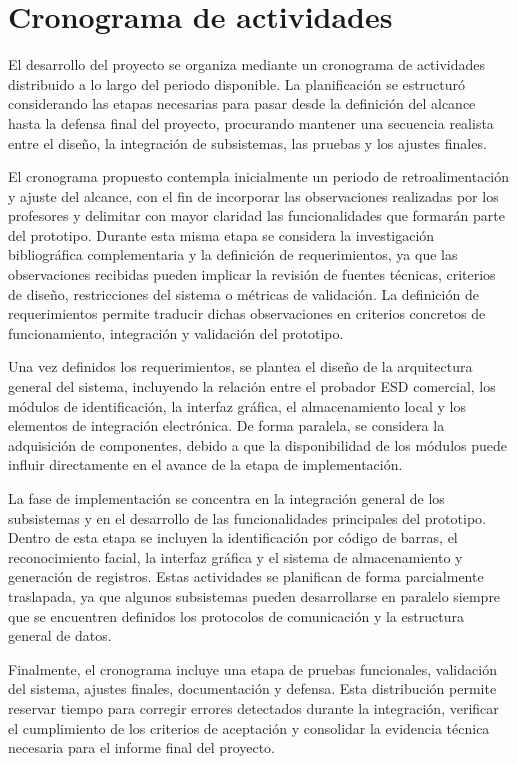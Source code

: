 \chapter{Cronograma de actividades}

El desarrollo del proyecto se organiza mediante un cronograma de actividades
distribuido a lo largo del periodo disponible. La planificación se
estructuró considerando las etapas necesarias para pasar desde la definición del
alcance hasta la defensa final del proyecto, procurando mantener una secuencia
realista entre el diseño, la integración de subsistemas, las pruebas y los
ajustes finales.

El cronograma propuesto contempla inicialmente un periodo de retroalimentación y
ajuste del alcance, con el fin de incorporar las observaciones realizadas por
los profesores y delimitar con mayor claridad las funcionalidades que formarán
parte del prototipo. Durante esta misma etapa se considera la investigación
bibliográfica complementaria y la definición de requerimientos, ya que las
observaciones recibidas pueden implicar la revisión de fuentes técnicas,
criterios de diseño, restricciones del sistema o métricas de validación.
La definición de requerimientos permite traducir dichas observaciones en 
criterios concretos de funcionamiento, integración y validación del prototipo.

Una vez definidos los requerimientos, se plantea el diseño de la arquitectura
general del sistema, incluyendo la relación entre el probador ESD comercial, los
módulos de identificación, la interfaz gráfica, el almacenamiento local y los
elementos de integración electrónica. De forma paralela, se considera la
adquisición de componentes, debido a que la disponibilidad de los módulos puede
influir directamente en el avance de la etapa de implementación.

La fase de implementación se concentra en la integración general de los
subsistemas y en el desarrollo de las funcionalidades principales del prototipo.
Dentro de esta etapa se incluyen la identificación por código de barras, el
reconocimiento facial, la interfaz gráfica y el sistema de almacenamiento y
generación de registros. Estas actividades se planifican de forma parcialmente
traslapada, ya que algunos subsistemas pueden desarrollarse en paralelo siempre
que se encuentren definidos los protocolos de comunicación y la estructura
general de datos.

Finalmente, el cronograma incluye una etapa de pruebas funcionales, validación
del sistema, ajustes finales, documentación y defensa. Esta distribución permite
reservar tiempo para corregir errores detectados durante la integración,
verificar el cumplimiento de los criterios de aceptación y consolidar la
evidencia técnica necesaria para el informe final del proyecto.

